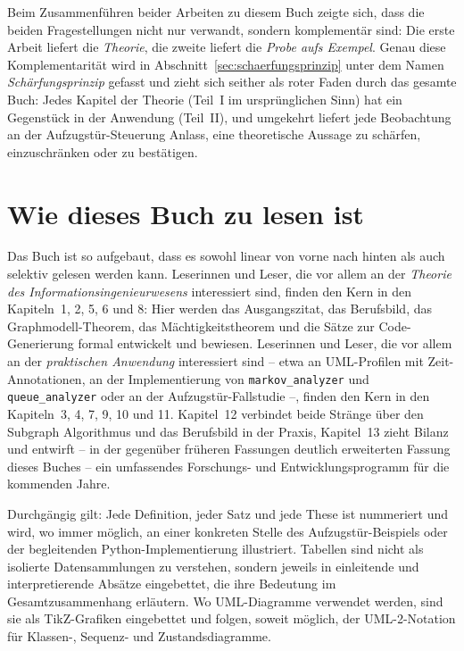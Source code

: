 ﻿\documentclass[a4paper,12pt]{report}
\theoremstyle{definition}
\begin{document}
Beim Zusammenführen beider Arbeiten zu diesem Buch zeigte sich, dass die
beiden Fragestellungen nicht nur verwandt, sondern komplementär sind: Die
erste Arbeit liefert die \emph{Theorie}, die zweite liefert die
\emph{Probe aufs Exempel}. Genau diese Komplementarität wird in
Abschnitt~\ref{sec:schaerfungsprinzip} unter dem Namen
\emph{Schärfungsprinzip} gefasst und zieht sich seither als roter Faden
durch das gesamte Buch: Jedes Kapitel der Theorie (Teil~I im ursprünglichen
Sinn) hat ein Gegenstück in der Anwendung (Teil~II), und umgekehrt liefert
jede Beobachtung an der Aufzugstür-Steuerung Anlass, eine theoretische
Aussage zu schärfen, einzuschränken oder zu bestätigen.

\section*{Wie dieses Buch zu lesen ist}

Das Buch ist so aufgebaut, dass es sowohl linear von vorne nach hinten als
auch selektiv gelesen werden kann. Leserinnen und Leser, die vor allem an
der \emph{Theorie des Informationsingenieurwesens} interessiert sind,
finden den Kern in den Kapiteln~1, 2, 5, 6 und 8: Hier werden das
Ausgangszitat, das Berufsbild, das Graphmodell-Theorem, das
Mächtigkeitstheorem und die Sätze zur Code-Generierung formal entwickelt
und bewiesen. Leserinnen und Leser, die vor allem an der \emph{praktischen
Anwendung} interessiert sind -- etwa an UML-Profilen mit
Zeit-Annotationen, an der Implementierung von \texttt{markov\_analyzer} und
\texttt{queue\_analyzer} oder an der Aufzugstür-Fallstudie --, finden den
Kern in den Kapiteln~3, 4, 7, 9, 10 und 11. Kapitel~12 verbindet beide
Stränge über den Subgraph Algorithmus und das Berufsbild in der Praxis,
Kapitel~13 zieht Bilanz und entwirft -- in der gegenüber früheren Fassungen
deutlich erweiterten Fassung dieses Buches -- ein umfassendes Forschungs-
und Entwicklungsprogramm für die kommenden Jahre.

Durchgängig gilt: Jede Definition, jeder Satz und jede These ist nummeriert
und wird, wo immer möglich, an einer konkreten Stelle des
Aufzugstür-Beispiels oder der begleitenden Python-Implementierung
illustriert. Tabellen sind nicht als isolierte Datensammlungen zu
verstehen, sondern jeweils in einleitende und interpretierende Absätze
eingebettet, die ihre Bedeutung im Gesamtzusammenhang erläutern. Wo
UML-Diagramme verwendet werden, sind sie als TikZ-Grafiken eingebettet und
folgen, soweit möglich, der UML-2-Notation für Klassen-, Sequenz- und
Zustandsdiagramme.
\end{document}
